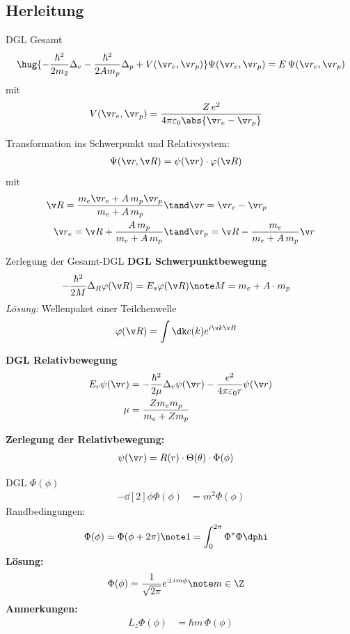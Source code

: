 \documentclass[twocolumn]{summery_4.1}
\begin{document}
\subsection{Herleitung}
{\large DGL Gesamt}
\begin{align*}
    \hug{-\frac{\hbar^2}{2m_2} \Delta_e - \frac{\hbar^2}{2A m_p}\Delta_p + V(\v r_e, \v r_p)} \Psi(\v r_e, \v r_p) = E \,\Psi(\v r_e, \v r_p)
\end{align*}
mit 
\begin{align*}
    V(\v r_e, \v r_p) &= \frac{Z\, e^2}{4\pi \varepsilon_0 \abs{\v r_e - \v r_p}}
\end{align*}

Transformation ins Schwerpunkt und Relativsystem:
\begin{align*}
    \Psi(\v r, \v R) &= \psi(\v r)\cdot \varphi(\v R)
\end{align*}
mit 
\begin{align*}
    \v R = \frac{m_e \v r_e + A\, m_p \v r_p}{m_e + A \, m_p}&\tand \v r= \v r_e - \v r_p\\
    \v r_e = \v R + \frac{A\, m_p}{m_e + A\, m_p} &\tand \v r_p = \v R - \frac{m_e}{m_e + A\, m_p} \v r
\end{align*}

{\large Zerlegung der Gesamt-DGL}
{\bf DGL Schwerpunktbewegung}
\begin{align*}
    -\frac{\hbar^2}{2M} \Delta_R \varphi(\v R) &= E_s \varphi(\v R)\note M = m_e +A\cdot m_p
\end{align*}
\textit{Lösung:} Wellenpaket einer Teilchenwelle
\begin{align*}
    \varphi(\v R) &= \int\dk c(k) e^{i\v k \v R}
\end{align*}

{\bf DGL Relativbewegung}
\begin{align*}
    E_r \psi(\v r) &= -\frac{\hbar^2}{2\mu} \Delta_r \psi(\v r) - \frac{e^2}{4\pi\varepsilon_0 r } \psi(\v r) \\
    \mu &= \frac{Z m_e m_p}{m_e + Z m_p}
\end{align*}

\textbf{Zerlegung der Relativbewegung:}
\begin{align*}
    \psi(\v r) &= R(r) \cdot \Theta(\theta) \cdot \Phi(\phi)
\end{align*}

{\large DGL $\Phi(\phi)$}
\begin{align*}
    - \dd[2]{}\phi \Phi(\phi) &= m^2 \Phi(\phi)
\end{align*}
Randbedingungen:
\begin{align*}
    \Phi(\phi) &= \Phi(\phi+2\pi)\note 1 = \int_0^{2\pi} \Phi^* \Phi \dphi
\end{align*}
\textbf{Lösung:}
\begin{align*}
    \Phi(\phi) &= \frac{1}{\sqrt{2\pi}} e^{\pm i m \phi}\note m\in \Z 
\end{align*}
\textbf{Anmerkungen:}
\begin{align*}
    L_z \Phi(\phi) &= \hbar m\, \Phi(\phi)
\end{align*}
\end{document}
